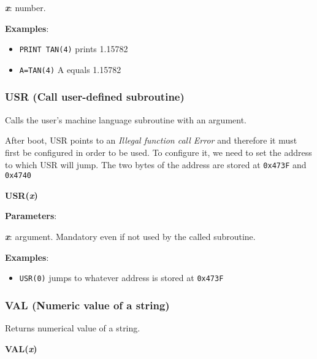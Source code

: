     \hspace{1cm}\textbf{\textit{x}}: number.

    \textbf{Examples}:
    \begin{itemize}
        \item \texttt{PRINT TAN(4)} prints 1.15782
        \item \texttt{A=TAN(4)} A equals 1.15782
    \end{itemize}

    \subsubsection{{USR (Call user-defined subroutine)}}
    \label{msbasic:lang:usr}
    Calls the user's machine language subroutine with an argument.

    After boot, USR points to an \textit{Illegal function call Error} and
    therefore it must first be configured in order to be used. To configure it,
    we need to set the address to which USR will jump. The two bytes of the
    address are stored at \texttt{0x473F} and \texttt{0x4740}

    \hspace{1.9cm}\textbf{USR(\textit{x})}

    \textbf{Parameters}:

    \hspace{1cm}\textbf{\textit{x}}: argument. Mandatory even if not used by the
    called subroutine.

    \textbf{Examples}:
    \begin{itemize}
        \item \texttt{USR(0)} jumps to whatever address is stored at
        \texttt{0x473F}
    \end{itemize}

    \subsubsection{{VAL (Numeric value of a string)}}
    \label{msbasic:lang:val}
    Returns numerical value of a string.

    \hspace{1.9cm}\textbf{VAL(\textit{x})}

